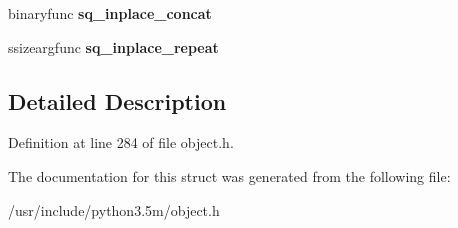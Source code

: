 \begin{DoxyCompactItemize}
\item 
binaryfunc {\bfseries sq\+\_\+inplace\+\_\+concat}\hypertarget{structPySequenceMethods_affec621f1814e2cff5abb2d907f9bf59}{}\label{structPySequenceMethods_affec621f1814e2cff5abb2d907f9bf59}

\item 
ssizeargfunc {\bfseries sq\+\_\+inplace\+\_\+repeat}\hypertarget{structPySequenceMethods_a6e8b51006d6635efddd6d5e03514eff8}{}\label{structPySequenceMethods_a6e8b51006d6635efddd6d5e03514eff8}

\end{DoxyCompactItemize}


\subsection{Detailed Description}


Definition at line 284 of file object.\+h.



The documentation for this struct was generated from the following file\+:\begin{DoxyCompactItemize}
\item 
/usr/include/python3.\+5m/object.\+h\end{DoxyCompactItemize}
